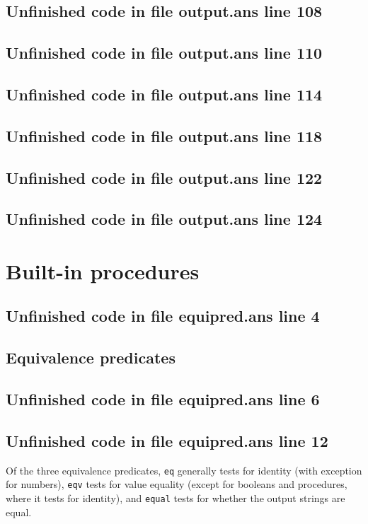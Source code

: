 \documentclass[twoside,9pt]{report}
\begin{document}
\section{Unfinished code in file output.ans line 108}
\section{Unfinished code in file output.ans line 110}
\section{Unfinished code in file output.ans line 114}
\section{Unfinished code in file output.ans line 118}
\section{Unfinished code in file output.ans line 122}
\section{Unfinished code in file output.ans line 124}
\chapter{Built-in procedures}
\label{built-in-procedures}
\section{Unfinished code in file equipred.ans line 4}
\section{Equivalence predicates}
\label{equivalence-predicates}
\section{Unfinished code in file equipred.ans line 6}

\section{Unfinished code in file equipred.ans line 12}

Of the three equivalence predicates, \texttt{eq} generally tests for identity (with exception for numbers), \texttt{eqv} tests for value equality (except for booleans and procedures, where it tests for identity), and \texttt{equal} tests for whether the output strings are equal.
\end{document}

